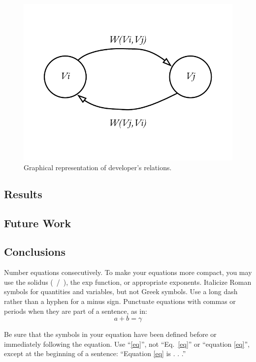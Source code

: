 \documentclass[conference]{IEEEtran}
\begin{document}
\begin{figure}[htbp]
\centerline{\includegraphics{graph}}
\caption{Graphical representation of developer's relations.}
\label{fig:graph}
\end{figure}


\subsection{Results}

\subsection{Future Work}

\subsection{Conclusions}

Number equations consecutively. To make your
equations more compact, you may use the solidus (~/~), the exp function, or
appropriate exponents. Italicize Roman symbols for quantities and variables,
but not Greek symbols. Use a long dash rather than a hyphen for a minus
sign. Punctuate equations with commas or periods when they are part of a
sentence, as in:
\begin{equation}
a+b=\gamma\label{eq}
\end{equation}

Be sure that the
symbols in your equation have been defined before or immediately following
the equation. Use ``\eqref{eq}'', not ``Eq.~\eqref{eq}'' or ``equation \eqref{eq}'', except at
the beginning of a sentence: ``Equation \eqref{eq} is . . .''
\end{document}
